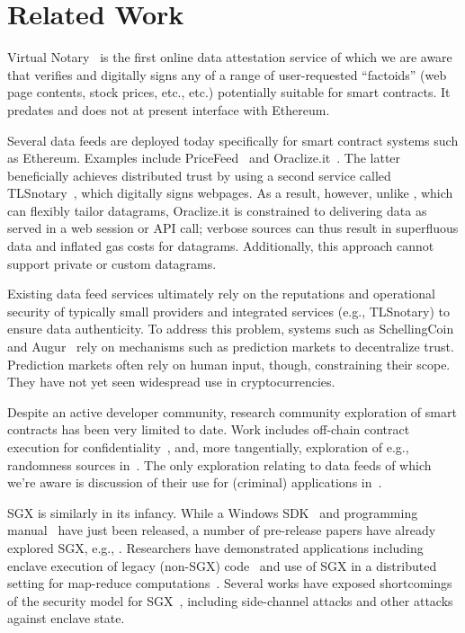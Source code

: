 \section{Related Work}
\label{sec:related}

Virtual Notary~\cite{VN:2013,VN:2016} is the first online data attestation service of which we are aware that verifies and digitally signs any of a range of user-requested ``factoids'' (web page contents, stock prices, etc., etc.) potentially suitable for smart contracts. It predates and does not at present interface with Ethereum.

Several data feeds are deployed today specifically for smart contract systems such as Ethereum. Examples include PriceFeed~\cite{PriceFeed:2016} and Oraclize.it~\cite{Oraclize:2016}. The latter beneficially achieves distributed trust by using a second service called TLSnotary~\cite{TLSnotary}, which digitally signs webpages. As a result, however, unlike \tc, which can flexibly tailor datagrams, Oraclize.it is constrained to delivering data as served in a web session or API call; verbose sources can thus result in superfluous data and inflated gas costs for datagrams. Additionally, this approach cannot support private or custom datagrams. 

Existing data feed services ultimately rely on the reputations and operational security of typically small providers and integrated services (e.g., TLSnotary) to ensure data authenticity. 
To address this problem, systems such as SchellingCoin~\cite{schellingcoin} and Augur~\cite{augur} rely on mechanisms such as prediction markets to decentralize trust. Prediction markets often rely on human input, though, constraining their scope. They have not yet seen widespread use in cryptocurrencies. 

Despite an active developer community, research community exploration of smart contracts has been very limited to date. Work includes off-chain contract execution for confidentiality~\cite{hawk}, and, more tangentially, exploration of e.g., randomness sources in~\cite{bonneau2015bitcoin}. The only exploration relating to data feeds of which we're aware is discussion of their use for (criminal) applications in~\cite{gyges}.

SGX is similarly in its infancy.
While a Windows SDK~\cite{sgxsdk} and programming manual~\cite{sgxmanual} have just been released, a number of pre-release papers have already explored SGX, e.g., \cite{VC3,7163052,anati2013innovative,McKeen:2013jv,Phegade:2013km}. Researchers have demonstrated applications including enclave execution of legacy (non-SGX) code~\cite{haven} and use of SGX in a distributed setting for map-reduce computations~\cite{VC3}. Several works have exposed shortcomings of the security model for SGX~\cite{sgxexplained,sgxsok,shihardwaretalk}, including side-channel attacks and other attacks against enclave state. 


